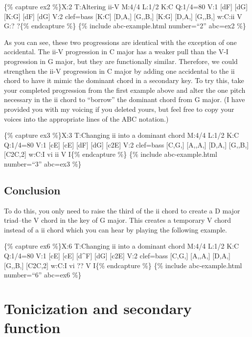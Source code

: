 \documentclass{book}
\begin{document}
\{\% capture ex2 \%\}X:2 T:Altering ii-V M:4/4 L:1/2 K:C Q:1/4=80 V:1 {[}dF{]}
{[}dG{]}\textbar\textbar{} {[}K:G{]} {[}dF{]} {[}dG{]}\textbar\textbar{} V:2
clef=bass {[}K:C{]} {[}D,A,{]} {[}G,,B,{]}\textbar\textbar{} {[}K:G{]}
{[}D,A,{]} {[}G,,B,{]}\textbar\textbar{} w:C:ii V G:? ?\{\% endcapture \%\}
\{\% include abc-example.html number=``2'' abc=ex2 \%\}

As you can see, these two progressions are identical with the exception of one
accidental. The ii-V progression in C major has a weaker pull than the V-I
progression in G major, but they are functionally similar. Therefore, we could
strengthen the ii-V progression in C major by adding one accidental to the ii
chord to have it mimic the dominant chord in a secondary key. To try this,
take your completed progression from the first example above and alter the one
pitch necessary in the ii chord to ``borrow'' the dominant chord from G major.
(I have provided you with my voicing if you deleted yours, but feel free to
copy your voices into the appropriate lines of the ABC notation.)

\{\% capture ex3 \%\}X:3 T:Changing ii into a dominant chord M:4/4 L:1/2 K:C
Q:1/4=80 V:1 {[}cE{]} {[}cE{]}\textbar{} {[}dF{]} {[}dG{]}\textbar{}
{[}c2E{]}\textbar{]} V:2 clef=bass {[}C,G,{]} {[}A,,A,{]}\textbar{} {[}D,A,{]}
{[}G,,B,{]}\textbar{} {[}C2C,2{]}\textbar{]} w:C:I vi ii V I\{\% endcapture
\%\} \{\% include abc-example.html number=``3'' abc=ex3 \%\}

\hypertarget{conclusion-5}{%
\subsection{Conclusion}\label{conclusion-5}}

To do this, you only need to raise the third of the ii chord to create a D
major triad--the V chord in the key of G major. This creates a temporary V
chord instead of a ii chord which you can hear by playing the following
example.

\{\% capture ex6 \%\}X:6 T:Changing ii into a dominant chord M:4/4 L:1/2 K:C
Q:1/4=80 V:1 {[}cE{]} {[}cE{]}\textbar{} {[}d\^{}F{]} {[}dG{]}\textbar{}
{[}c2E{]}\textbar{]} V:2 clef=bass {[}C,G,{]} {[}A,,A,{]}\textbar{} {[}D,A,{]}
{[}G,,B,{]}\textbar{} {[}C2C,2{]}\textbar{]} w:C:I vi ?? V I\{\% endcapture
\%\} \{\% include abc-example.html number=``6'' abc=ex6 \%\}

\hypertarget{tonicization-and-secondary-function}{%
\section{Tonicization and secondary
function}\label{tonicization-and-secondary-function}}
\end{document}
